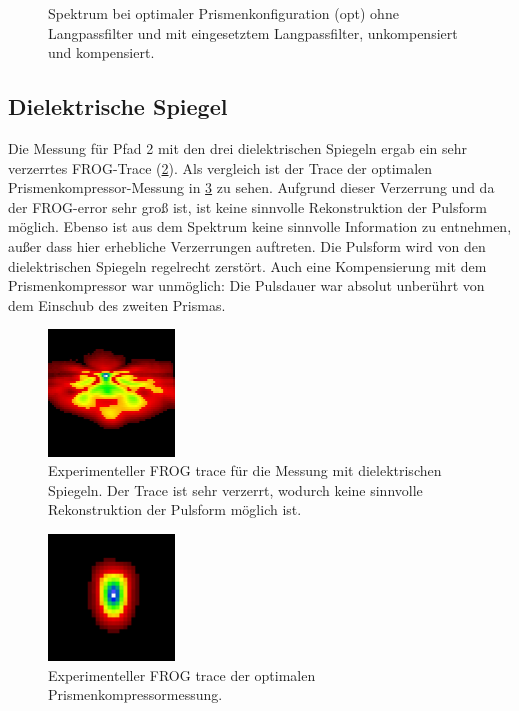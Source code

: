 \documentclass[twoside,        %
               BCOR12mm,       %
               english,ngerman, %
               fleqn,headsepline=false,footsepline=false
              ]{Vorlage/MFPREPORT}
\begin{document}
\begin{figure}[]
    \begin{center}
        
    \end{center}
    \caption{Spektrum bei optimaler Prismenkonfiguration (opt) ohne
    Langpassfilter und mit eingesetztem Langpassfilter, unkompensiert und
    kompensiert.}
    \label{fig:long2}
\end{figure}

\subsection{Dielektrische Spiegel}
Die Messung für Pfad 2 mit den drei dielektrischen Spiegeln ergab ein sehr
verzerrtes FROG-Trace (\cref{fig:diel}). Als vergleich ist der Trace der optimalen
Prismenkompressor-Messung in \cref{fig:opttrace} zu sehen. Aufgrund dieser
Verzerrung und da der FROG-error sehr groß ist, ist keine sinnvolle
Rekonstruktion der Pulsform möglich. Ebenso ist aus dem Spektrum keine
sinnvolle Information zu entnehmen, außer dass hier erhebliche Verzerrungen
auftreten. Die Pulsform wird von den dielektrischen Spiegeln regelrecht
zerstört. Auch eine Kompensierung mit dem Prismenkompressor war unmöglich: Die
Pulsdauer war absolut unberührt von dem Einschub des zweiten Prismas.

\begin{figure}[]
    \centering
    \includegraphics[width=0.3\textwidth]{diel.jpg}
    \caption{Experimenteller FROG trace für die Messung mit dielektrischen
    Spiegeln. Der Trace ist sehr verzerrt, wodurch keine sinnvolle
Rekonstruktion der Pulsform möglich ist. }
    \label{fig:diel}
\end{figure}
\begin{figure}[]
    \centering
    \includegraphics[width=0.3\textwidth]{opttrace.jpg}
    \caption{Experimenteller FROG trace der optimalen Prismenkompressormessung.}
    \label{fig:opttrace}
\end{figure}
\end{document}
